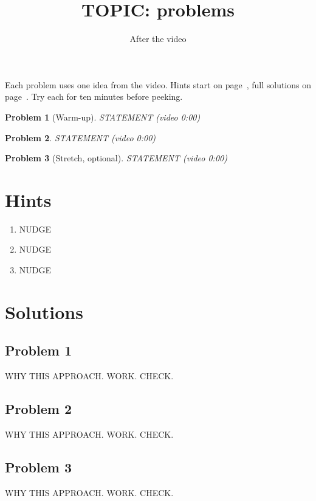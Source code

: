 \documentclass[11pt]{article}
\title{TOPIC: problems}
\author{After the video}
\date{}
\newtheorem{problem}{Problem}
\newcommand{\see}[1]{\hfill{\color{gray}\small (video #1)}}
\begin{document}
\maketitle
\noindent Each problem uses one idea from the video. Hints start on page~\pageref{hints}, full solutions on
page~\pageref{solutions}. Try each for ten minutes before peeking.

\begin{problem}[Warm-up]
STATEMENT \see{0:00}
\end{problem}

\begin{problem}
STATEMENT \see{0:00}
\end{problem}

\begin{problem}[Stretch, optional]
STATEMENT \see{0:00}
\end{problem}

\newpage
\section*{Hints}\label{hints}
\begin{enumerate}
  \item NUDGE
  \item NUDGE
  \item NUDGE
\end{enumerate}

\newpage
\section*{Solutions}\label{solutions}
\subsection*{Problem 1}
WHY THIS APPROACH. WORK. CHECK.

\subsection*{Problem 2}
WHY THIS APPROACH. WORK. CHECK.

\subsection*{Problem 3}
WHY THIS APPROACH. WORK. CHECK.
\end{document}

